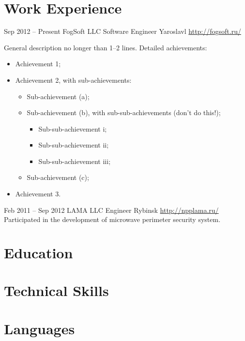 \documentclass[11pt,a4paper,sans]{moderncv}
\begin{document}
\makecvtitle
\section{Work Experience}
\cventry
  {Sep 2012 -- Present}
  {FogSoft LLC}
  {Software Engineer}
  {Yaroslavl}
  {\newline{}\url{http://fogsoft.ru/}}
  {General description no longer than 1--2 lines.\newline{}%
Detailed achievements:%
\begin{itemize}%
\item Achievement 1;
\item Achievement 2, with sub-achievements:
  \begin{itemize}%
  \item Sub-achievement (a);
  \item Sub-achievement (b), with sub-sub-achievements (don't do this!);
    \begin{itemize}
    \item Sub-sub-achievement i;
    \item Sub-sub-achievement ii;
    \item Sub-sub-achievement iii;
    \end{itemize}
  \item Sub-achievement (c);
  \end{itemize}
\item Achievement 3.
\end{itemize}}
\cventry
  {Feb 2011 -- Sep 2012}
  {LAMA LLC}
  {Engineer}
  {Rybinsk}
  {\newline{}\url{http://npplama.ru/}}
  {Participated in the development of microwave perimeter security system.}
  
\section{Education}

\section{Technical Skills}

\section{Languages}
\end{document}
